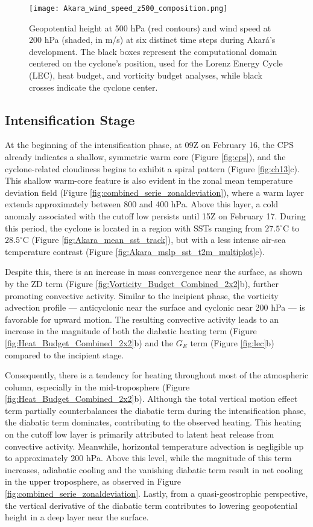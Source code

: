 \documentclass[pdflatex,sn-chicago]{sn-jnl}%
\theoremstyle{plain}
\theoremstyle{definition}
\theoremstyle{remark}
\theoremstyle{definition}
\begin{document}
\begin{figure}[h!]
\centering
\texttt{[image: Akara\_wind\_speed\_z500\_composition.png]}
\caption{Geopotential height at 500 hPa (red contours) and wind speed at 200 hPa (shaded, in m/s) at six distinct time steps during Akará's development. The black boxes represent the computational domain centered on the cyclone's position, used for the Lorenz Energy Cycle (LEC), heat budget, and vorticity budget analyses, while black crosses indicate the cyclone center.}
\label{fig:Akara_wind_speed_z500_composition}
\end{figure}

\subsection{Intensification Stage}

At the beginning of the intensification phase, at 09Z on February 16, the CPS already indicates a shallow, symmetric warm core (Figure \ref{fig:cps}), and the cyclone-related cloudiness begins to exhibit a spiral pattern (Figure \ref{fig:ch13}c). This shallow warm-core feature is also evident in the zonal mean temperature deviation field (Figure \ref{fig:combined_serie_zonaldeviation}), where a warm layer extends approximately between 800 and 400 hPa. Above this layer, a cold anomaly associated with the cutoff low persists until 15Z on February 17. During this period, the cyclone is located in a region with SSTs ranging from $27.5^{\circ}\text{C}$ to $28.5^{\circ}\text{C}$ (Figure \ref{fig:Akara_mean_sst_track}), but with a less intense air-sea temperature contrast (Figure \ref{fig:Akara_mslp_sst_t2m_multiplot}c). 

Despite this, there is an increase in mass convergence near the surface, as shown by the ZD term (Figure \ref{fig:Vorticity_Budget_Combined_2x2}b), further promoting convective activity. Similar to the incipient phase, the vorticity advection profile — anticyclonic near the surface and cyclonic near 200 hPa — is favorable for upward motion. The resulting convective activity leads to an increase in the magnitude of both the diabatic heating term (Figure \ref{fig:Heat_Budget_Combined_2x2}b) and the $G_E$ term (Figure \ref{fig:lec}b) compared to the incipient stage.

Consequently, there is a tendency for heating throughout most of the atmospheric column, especially in the mid-troposphere (Figure \ref{fig:Heat_Budget_Combined_2x2}b). Although the total vertical motion effect term partially counterbalances the diabatic term during the intensification phase, the diabatic term dominates, contributing to the observed heating. This heating on the cutoff low layer is primarily attributed to latent heat release from convective activity. Meanwhile, horizontal temperature advection is negligible up to approximately 200 hPa. Above this level, while the magnitude of this term increases, adiabatic cooling and the vanishing diabatic term result in net cooling in the upper troposphere, as observed in Figure \ref{fig:combined_serie_zonaldeviation}. Lastly, from a quasi-geostrophic perspective, the vertical derivative of the diabatic term contributes to lowering geopotential height in a deep layer near the surface.
\end{document}
